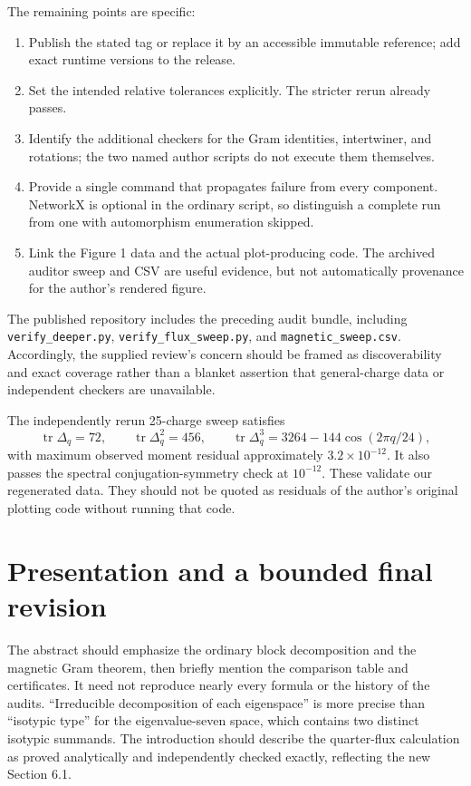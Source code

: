 \documentclass[11pt,a4paper]{article}
\newcommand{\tr}{\operatorname{tr}}\newcommand{\diag}{\operatorname{diag}}
\begin{document}
The remaining points are specific:
\begin{enumerate}
\item Publish the stated tag or replace it by an accessible immutable reference; add exact runtime versions to the release.
\item Set the intended relative tolerances explicitly. The stricter rerun already passes.
\item Identify the additional checkers for the Gram identities, intertwiner, and rotations; the two named author scripts do not execute them themselves.
\item Provide a single command that propagates failure from every component. NetworkX is optional in the ordinary script, so distinguish a complete run from one with automorphism enumeration skipped.
\item Link the Figure 1 data and the actual plot-producing code. The archived auditor sweep and CSV are useful evidence, but not automatically provenance for the author's rendered figure.
\end{enumerate}
The published repository includes the preceding audit bundle, including \texttt{verify\_deeper.py}, \texttt{verify\_flux\_sweep.py}, and \texttt{magnetic\_sweep.csv}. Accordingly, the supplied review's concern should be framed as discoverability and exact coverage rather than a blanket assertion that general-charge data or independent checkers are unavailable.

The independently rerun 25-charge sweep satisfies
\[
 \tr\Delta_q=72,\qquad \tr\Delta_q^2=456,\qquad
 \tr\Delta_q^3=3264-144\cos(2\pi q/24),
\]
with maximum observed moment residual approximately $3.2\times10^{-12}$. It also passes the spectral conjugation-symmetry check at $10^{-12}$. These validate our regenerated data. They should not be quoted as residuals of the author's original plotting code without running that code.

\section{Presentation and a bounded final revision}
The abstract should emphasize the ordinary block decomposition and the magnetic Gram theorem, then briefly mention the comparison table and certificates. It need not reproduce nearly every formula or the history of the audits. ``Irreducible decomposition of each eigenspace'' is more precise than ``isotypic type'' for the eigenvalue-seven space, which contains two distinct isotypic summands. The introduction should describe the quarter-flux calculation as proved analytically and independently checked exactly, reflecting the new Section 6.1.
\end{document}
